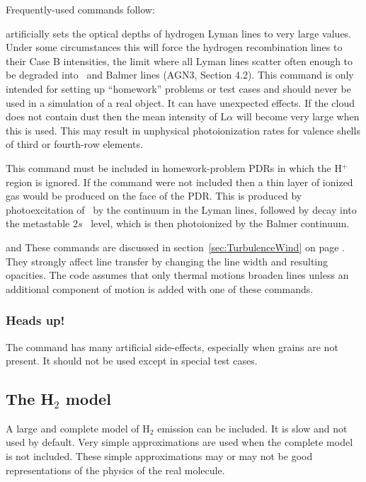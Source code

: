 \documentclass[12pt,twoside]{article}
\begin{document}
{Frequently-used commands follow:

 \label{command:CaseB}
artificially sets the
optical depths of hydrogen Lyman lines to
very large values.  Under some circumstances this will force the hydrogen
recombination lines to their Case B intensities, the limit where all Lyman
lines scatter often enough to be degraded into \la\ and
Balmer lines (AGN3, Section 4.2).
This command is only intended for setting up ``homework'' problems or test
cases and should never be used in a simulation of a real object.  It can
have unexpected effects.  If the cloud does not contain dust then the mean
intensity of $\mathrm{L}\alpha$ will become very
large when this is used.  This may result
in unphysical photoionization rates for
valence shells of third or fourth-row elements.

   This command must be included in 
homework-problem PDRs in which the
H$^+$ region is ignored.  If the command were not included then a thin layer
of ionized gas would be produced on the face of the PDR.  This is produced
by photoexcitation of \hO\ by the continuum in the Lyman lines, followed by
decay into the metastable $2s$ \hO\ level, which is then photoionized by the Balmer
continuum.

 and \quad  These
commands are discussed in section~\ref{sec:TurbulenceWind}
on page \pageref{sec:TurbulenceWind}.
They strongly affect line transfer by changing the line width and resulting
opacities.  The code assumes that only thermal motions broaden lines unless
an additional component of motion is added with one of these commands.

\subsubsection{Heads up!}

The  command has many
artificial side-effects, especially when
grains are not present.
It should not be used except in special test cases.

\subsection{The H$_2$ model}

A large and complete model of H$_2$ emission can be included.
It is slow and not used by default.  Very simple approximations
are used when the complete model is not included.  These
simple approximations may or may not be good representations of the physics
of the real molecule.

}
\end{document}
